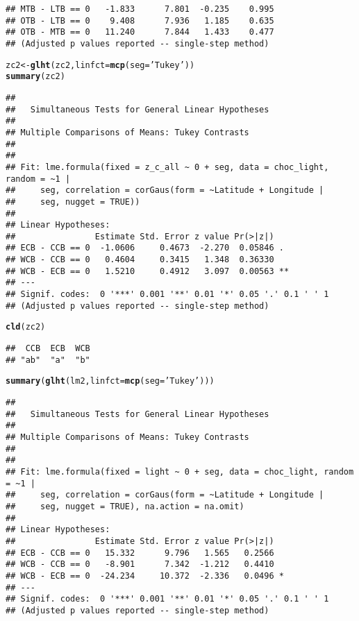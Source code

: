 \documentclass[letterpaper,12pt]{article}\usepackage[]{graphicx}\usepackage[]{color}
\makeatletter
\newcommand{\hlstr}[1]{\textcolor[rgb]{0.192,0.494,0.8}{#1}}%
\newcommand{\hlstd}[1]{\textcolor[rgb]{0.345,0.345,0.345}{#1}}%
\newcommand{\hlkwb}[1]{\textcolor[rgb]{0.69,0.353,0.396}{#1}}%
\newcommand{\hlkwc}[1]{\textcolor[rgb]{0.333,0.667,0.333}{#1}}%
\newcommand{\hlkwd}[1]{\textcolor[rgb]{0.737,0.353,0.396}{\textbf{#1}}}%
\newenvironment{kframe}{%
 \def\at@end@of@kframe{}%
 \ifinner\ifhmode%
  \def\at@end@of@kframe{\end{minipage}}%
  \begin{minipage}{\columnwidth}%
 \fi\fi%
 \def\FrameCommand##1{\hskip\@totalleftmargin \hskip-\fboxsep
 \colorbox{shadecolor}{##1}\hskip-\fboxsep
     \hskip-\linewidth \hskip-\@totalleftmargin \hskip\columnwidth}%
 \MakeFramed {\advance\hsize-\width
   \@totalleftmargin\z@ \linewidth\hsize
   \@setminipage}}%
 {\par\unskip\endMakeFramed%
 \at@end@of@kframe}
\newenvironment{knitrout}{}{} %
\makeatother
\begin{document}
\begin{knitrout}
\begin{kframe}
\begin{verbatim}
## MTB - LTB == 0   -1.833      7.801  -0.235    0.995
## OTB - LTB == 0    9.408      7.936   1.185    0.635
## OTB - MTB == 0   11.240      7.844   1.433    0.477
## (Adjusted p values reported -- single-step method)
\end{verbatim}
\begin{alltt}
\hlstd{zc2} \hlkwb{<-} \hlkwd{glht}\hlstd{(zc2,} \hlkwc{linfct} \hlstd{=} \hlkwd{mcp}\hlstd{(}\hlkwc{seg} \hlstd{=} \hlstr{'Tukey'}\hlstd{))}
\hlkwd{summary}\hlstd{(zc2)}
\end{alltt}
\begin{verbatim}
## 
## 	 Simultaneous Tests for General Linear Hypotheses
## 
## Multiple Comparisons of Means: Tukey Contrasts
## 
## 
## Fit: lme.formula(fixed = z_c_all ~ 0 + seg, data = choc_light, random = ~1 | 
##     seg, correlation = corGaus(form = ~Latitude + Longitude | 
##     seg, nugget = TRUE))
## 
## Linear Hypotheses:
##                Estimate Std. Error z value Pr(>|z|)   
## ECB - CCB == 0  -1.0606     0.4673  -2.270  0.05846 . 
## WCB - CCB == 0   0.4604     0.3415   1.348  0.36330   
## WCB - ECB == 0   1.5210     0.4912   3.097  0.00563 **
## ---
## Signif. codes:  0 '***' 0.001 '**' 0.01 '*' 0.05 '.' 0.1 ' ' 1
## (Adjusted p values reported -- single-step method)
\end{verbatim}
\begin{alltt}
\hlkwd{cld}\hlstd{(zc2)}
\end{alltt}
\begin{verbatim}
##  CCB  ECB  WCB 
## "ab"  "a"  "b"
\end{verbatim}
\begin{alltt}
\hlkwd{summary}\hlstd{(}\hlkwd{glht}\hlstd{(lm2,} \hlkwc{linfct} \hlstd{=} \hlkwd{mcp}\hlstd{(}\hlkwc{seg} \hlstd{=} \hlstr{'Tukey'}\hlstd{)))}
\end{alltt}
\begin{verbatim}
## 
## 	 Simultaneous Tests for General Linear Hypotheses
## 
## Multiple Comparisons of Means: Tukey Contrasts
## 
## 
## Fit: lme.formula(fixed = light ~ 0 + seg, data = choc_light, random = ~1 | 
##     seg, correlation = corGaus(form = ~Latitude + Longitude | 
##     seg, nugget = TRUE), na.action = na.omit)
## 
## Linear Hypotheses:
##                Estimate Std. Error z value Pr(>|z|)  
## ECB - CCB == 0   15.332      9.796   1.565   0.2566  
## WCB - CCB == 0   -8.901      7.342  -1.212   0.4410  
## WCB - ECB == 0  -24.234     10.372  -2.336   0.0496 *
## ---
## Signif. codes:  0 '***' 0.001 '**' 0.01 '*' 0.05 '.' 0.1 ' ' 1
## (Adjusted p values reported -- single-step method)

\end{verbatim}
\end{kframe}
\end{knitrout}
\end{document}
